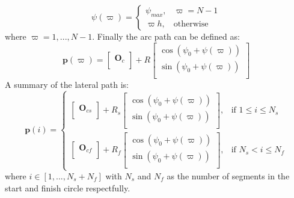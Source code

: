 \begin{equation}
\psi(\varpi) = \begin{cases}
\psi_{max}, & \varpi = N-1 \\
\varpi h, & \text{otherwise}
\end{cases}
\end{equation}
where $\varpi = 1,...,N-1$. Finally the arc path can be defined as:
\begin{equation}
\mathbf{p}(\varpi) = \begin{bmatrix}
\mathbf{O}_c \\
\end{bmatrix} + R\begin{bmatrix}
\cos(\psi_0 + \psi(\varpi)) \\
\sin(\psi_0 + \psi(\varpi)) \\
\end{bmatrix}
\end{equation}
A summary of the lateral path is:
\begin{equation}
\mathbf{p}(i) = \begin{cases}
\begin{bmatrix}
\mathbf{O}_{cs} \\
\end{bmatrix} + R_s\begin{bmatrix}
\cos(\psi_{0} + \psi(\varpi)) \\
\sin(\psi_{0} + \psi(\varpi)) \\
\end{bmatrix}, &  \text{if } 1\leq i \leq N_s \\
\begin{bmatrix}
\mathbf{O}_{cf} \\
\end{bmatrix} + R_f\begin{bmatrix}
\cos(\psi_{0} + \psi(\varpi)) \\
\sin(\psi_{0} + \psi(\varpi)) \\
\end{bmatrix}, & \text{if } N_s< i \leq N_f
\end{cases}
\end{equation}
where $i \in [1,...,N_s + N_f]$ with $N_s$ and $N_f$ as the number of segments in the start and finish circle respectfully.
